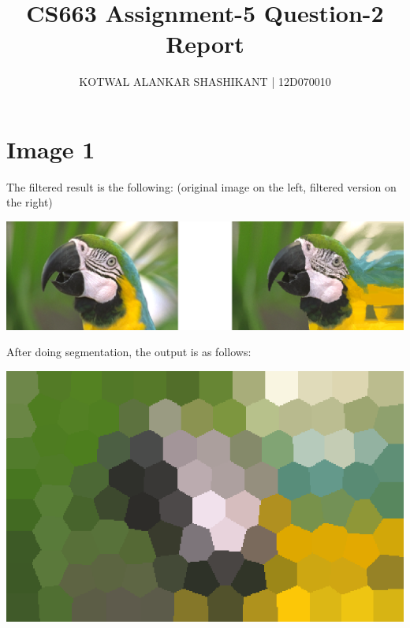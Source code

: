 \documentclass[11pt]{report}
\begin{document}
\title{CS663 Assignment-5 Question-2 Report}
\author{KOTWAL ALANKAR SHASHIKANT | 12D070010}
\maketitle

\section*{Image 1}
The filtered result is the following: (original image on the left, filtered version on the right)
\newline \newline
\centerline{\includegraphics[scale=0.5]{parrot_filtered.png}}
\newline \newline
After doing segmentation, the output is as follows:
\newline \newline
\centerline{\includegraphics[scale=0.5]{parrot_segmented.png}}

\newpage
\end{document}
